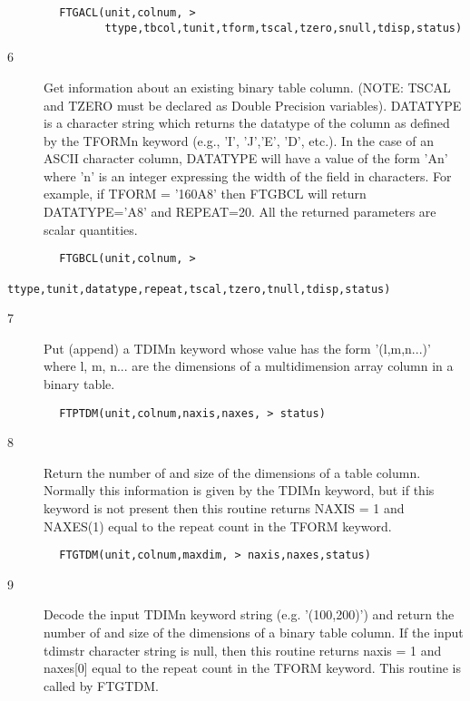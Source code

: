 \documentclass[11pt]{book}
\begin{document}
\begin{verbatim}
        FTGACL(unit,colnum, >
               ttype,tbcol,tunit,tform,tscal,tzero,snull,tdisp,status)
\end{verbatim}

\begin{description}
\item[6 ] Get information about an existing binary table column. (NOTE: TSCAL and
    TZERO must be declared as Double Precision variables). DATATYPE is a
    character string which returns the datatype of the column as defined
    by the TFORMn keyword (e.g., 'I', 'J','E', 'D', etc.).  In the case
    of an ASCII character column, DATATYPE will have a value of the
    form 'An' where 'n' is an integer expressing the width of the field
    in characters.  For example, if TFORM = '160A8' then FTGBCL will return
    DATATYPE='A8' and REPEAT=20.   All the returned parameters are scalar
   quantities.
\end{description}

\begin{verbatim}
        FTGBCL(unit,colnum, >
               ttype,tunit,datatype,repeat,tscal,tzero,tnull,tdisp,status)
\end{verbatim}

\begin{description}
\item[7 ] Put (append) a TDIMn keyword whose value has the form '(l,m,n...)'
    where l, m, n... are the dimensions of a multidimension array
   column in a binary table.
\end{description}

\begin{verbatim}
        FTPTDM(unit,colnum,naxis,naxes, > status)
\end{verbatim}

\begin{description}
\item[8 ] Return the number of and size of the dimensions of a table column.
    Normally this information is given by the TDIMn keyword, but if
    this keyword is not present then this routine returns NAXIS = 1
   and NAXES(1) equal to the repeat count in the TFORM keyword.
\end{description}

\begin{verbatim}
        FTGTDM(unit,colnum,maxdim, > naxis,naxes,status)
\end{verbatim}

\begin{description}
\item[9 ] Decode the input TDIMn keyword string (e.g. '(100,200)') and return the
    number of and size of the dimensions of a binary table column. If the input
    tdimstr character string is null, then this routine returns naxis = 1
    and naxes[0] equal to the repeat count in the TFORM keyword. This routine
   is called by FTGTDM.
\end{description}
\end{document}
